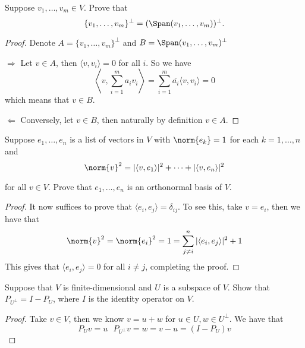 \documentclass{extarticle}
\begin{document}

\newpage
{}

\begin{problem}{1}
    Suppose \(v_1, \ldots, v_m \in V\). Prove that
    \[\{v_1, \ldots, v_m\}^\perp  = (\Span (v_1, \ldots, v_m))^\perp. \]
\end{problem}

\begin{proof}
Denote \(A = \{v_1, \ldots, v_m\}^\perp\) and \(B = \Span (v_1, \ldots, v_m)^\perp\)

\(\Rightarrow\) Let \( v \in A\), then \(\langle v,v_i \rangle =0 \) for all \(i\). So we have
\[\left\langle v,\sum_{i=1}^{m} a_i v_i \right\rangle = \sum_{i=1}^{m} \overline{a_i} \langle v,v_i \rangle = 0\]
which means that \(v \in B\).

\(\Leftarrow\) Conversely, let \(v \in B\), then naturally by definition \(v \in A\).
\end{proof}

\begin{problem}{4}
    Suppose \(e_1, \ldots, e_n\) is a list of vectors in \(V\) with \(\norm{e_k} = 1\) for each
    \(k = 1, \ldots, n\) and
    \[\norm{v}^2 = | \langle v,e_1 \rangle |^2 + \cdots + |\langle v,e_n \rangle|^2\]

    for all \(v \in V\). Prove that \(e_1, \ldots, e_n\) is an orthonormal basis of \(V\).
\end{problem}

\begin{proof}
It now suffices to prove that \(\langle e_i,e_j \rangle = \delta_{ij}\). To see this, take \(v = e_i\),
then we have that
\[\norm{v}^2 = \norm{e_i}^2 = 1 = \sum_{j \neq i}^{n} |\langle e_i,e_j \rangle|^2 + 1 \]
This gives that \(\langle e_i,e_j \rangle = 0\) for all \(i \neq j\), completing the proof.
\end{proof}

\begin{problem}{5}
    Suppose that \(V\) is finite-dimensional and \(U\) is a subspace of \(V\). Show that
    \(P_{U^\perp} = I - P_U\), where \(I\) is the identity operator on \(V\).
\end{problem}

\begin{proof}
Take \(v \in V\), then we know \(v = u + w\) for \(u \in U, w \in U^\perp\). We have that
\[P_U v = u \ \ \ P_{U^\perp} v = w = v - u = (I - P_U)v\]
\end{proof}
\end{document}
